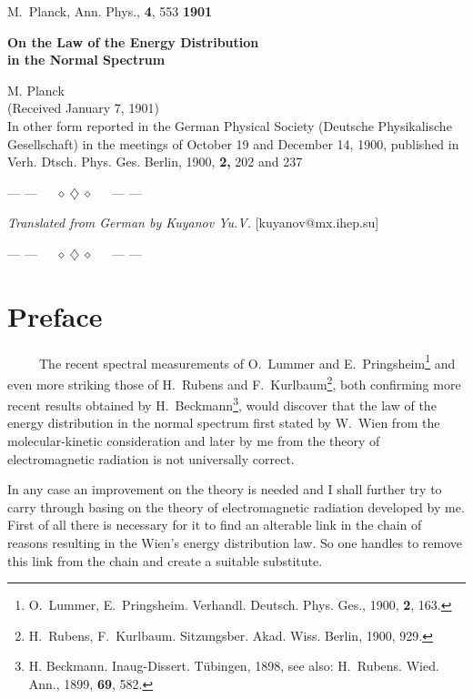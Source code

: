 \documentclass{article}
\begin{document}
M.~Planck, Ann. Phys., {\bf 4}, 553 \hfill {\large \bf 1901}\\

\begin{center}
{\large \bf On the Law of the Energy Distribution\\
in the Normal Spectrum}
\end{center}

\begin{center}
M. Planck\\
(Received January 7, 1901)\\
In other form reported in the German Physical Society 
(Deutsche Physikalische Gesellschaft) in the meetings of
October 19 and December 14, 1900, published in Verh. Dtsch. Phys. Ges.
Berlin, 1900, {\bf 2,} 202 and 237
\end{center}

\centerline{--- ---~~~$\diamond~\diamondsuit~\diamond$~~~--- ---}

\noindent
{\it Translated from German by Kuyanov Yu.V.} 
{[kuyanov@mx.ihep.su]}

\centerline{--- ---~~~$\diamond~\diamondsuit~\diamond$~~~--- ---}

\vspace{0.5cm}

\section*{
{\bf Preface}}

~~~~~The recent spectral measurements of O.~Lummer and 
E.~Pringsheim\footnote
{O.~Lummer, E.~Pringsheim. Verhandl. Deutsch. Phys. Ges., 1900, {\bf 2}, 163.} 
and even more striking those of H.~Rubens and F.~Kurlbaum\footnote{H.~Rubens, 
F.~Kurlbaum. Sitzungsber. Akad. Wiss. Berlin, 1900, 929.}, both confirming 
more recent results obtained by H.~Beckmann\footnote{H. Beckmann. 
Inaug-Dissert. T\"ubingen, 1898, 
see also: H.~Rubens. Wied. Ann., 1899, {\bf 69}, 582.}, 
would discover that the law of the energy distribution in the normal spectrum 
first stated by W.~Wien from the molecular-kinetic consideration and later 
by me from the theory of electromagnetic radiation is not universally correct.

In any case an improvement on the theory is needed 
and I shall further try to carry through 
basing on the theory of electromagnetic radiation developed by me. 
First of all there is necessary for it to find an alterable link 
in the chain of reasons resulting in the Wien's energy distribution law. 
So one handles to remove this link from the chain and 
create a suitable substitute.
\end{document}
